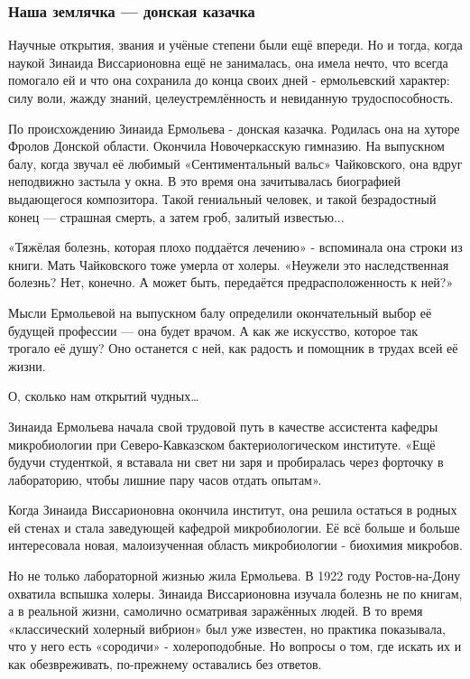 \subsubsection{Наша землячка --- донская казачка}

Научные открытия, звания и учёные степени были ещё впереди. Но и тогда, когда
наукой Зинаида Виссарионовна ещё не занималась, она имела нечто, что всегда
помогало ей и что она сохранила до конца своих дней - ермольевский характер:
силу воли, жажду знаний, целеустремлённость и невиданную трудоспособность.

По происхождению Зинаида Ермольева - донская казачка. Родилась она на хуторе
Фролов Донской области. Окончила Новочеркасскую гимназию. На выпускном балу,
когда звучал её любимый «Сентиментальный вальс» Чайковского, она вдруг
неподвижно застыла у окна. В это время она зачитывалась биографией выдающегося
композитора. Такой гениальный человек, и такой безрадостный конец --- страшная
смерть, а затем гроб, залитый известью...

«Тяжёлая болезнь, которая плохо поддаётся лечению» - вспоминала она строки из
книги. Мать Чайковского тоже умерла от холеры. «Неужели это наследственная
болезнь? Нет, конечно. А может быть, передаётся предрасположенность к ней?»

Мысли Ермольевой на выпускном балу определили окончательный выбор её будущей
профессии --- она будет врачом. А как же искусство, которое так трогало её душу?
Оно останется с ней, как радость и помощник в трудах всей её жизни.

О, сколько нам открытий чудных…

Зинаида Ермольева начала свой трудовой путь в качестве ассистента кафедры
микробиологии при Северо-Кавказском бактериологическом институте. «Ещё будучи
студенткой, я вставала ни свет ни заря и пробиралась через форточку в
лабораторию, чтобы лишние пару часов отдать опытам».

Когда Зинаида Виссарионовна окончила институт, она решила остаться в родных ей
стенах и стала заведующей кафедрой микробиологии. Её всё больше и больше
интересовала новая, малоизученная область микробиологии - биохимия микробов.

Но не только лабораторной жизнью жила Ермольева. В 1922 году Ростов-на-Дону
охватила вспышка холеры. Зинаида Виссарионовна изучала болезнь не по книгам, а
в реальной жизни, самолично осматривая заражённых людей. В то время
«классический холерный вибрион» был уже известен, но практика показывала, что у
него есть «сородичи» - холероподобные. Но вопросы о том, где искать их и как
обезвреживать, по-прежнему оставались без ответов.

